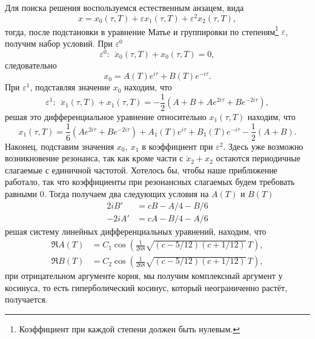 Для поиска решения воспользуемся естественным анзацем, вида
\begin{equation*}
    x = x_0(\tau, T) + \varepsilon x_1 (\tau, T) + \varepsilon^2 x_2 (\tau, T),
\end{equation*}
тогда, после подстановки в уравнение Матье и группировки по степеням\footnote{
    Коэффициент при каждой степени должен быть нулевым.
}  $\varepsilon$, получим набор условий. При $\varepsilon^0$
\begin{equation*}
    \varepsilon^0 \colon \ \ \ddot{x}_0(\tau, T) +  x_0(\tau, T) = 0,
\end{equation*}
следовательно
\begin{equation*}
    x_0 = A(T) e^{i\tau} + B(T) e^{-i\tau}.
\end{equation*}
При $\varepsilon^1$, подставляя значение $x_0$ находим, что
\begin{equation*}
    \varepsilon^1 \colon \ \ \ddot{x}_1(\tau, T) +  x_1(\tau, T) 
    = -\frac{1}{2}\left(
        A+B + A e^{2 i \tau} + B e^{- 2 i \tau}
    \right)
    ,
\end{equation*}
решая это дифференциальное уравнение относительно $x_1(\tau, T)$ находим, что
\begin{equation*}
    x_1(\tau, T) = \frac{1}{6} (Ae^{2 i \tau} + B e^{-2 i \tau}) + 
    A_1(T) e^{i \tau} + B_1(T) e^{-i \tau} - \frac{1}{2}(A+B).
\end{equation*}
Наконец, подставим значения $x_0,\ x_1$ в коэффициент при $\varepsilon^2$. Здесь уже возможно возникновение резонанса, так как кроме части с $\ddot{x}_2 + x_2$ остаются периодичные слагаемые с единичной частотой. Хотелось бы, чтобы наше приближение работало, так что коэффициенты при резонансных слагаемых будем требовать равными 0. Тогда получаем два следующих условия на $A(T)$ и $B(T)$ 
\begin{align*}
    2 i B' &= c B - A/4 - B/6 \\
    -2 i A' &= c A - B/4 - A/6
\end{align*}
решая систему линейных дифференциальных уравнений, находим, что
\begin{align*}
    \Re A(T) &= C_1 \cos\left(
        \frac{1}{268} \sqrt{(c - 5/12)(c+1/12)}\, T
    \right), \\
    \Re B(T) &= C_2 \cos\left(
        \frac{1}{268} \sqrt{(c - 5/12)(c+1/12)}\, T
    \right),
\end{align*}
при отрицательном аргументе корня, мы получим комплексный аргумент у косинуса, то есть гиперболический косинус, который неограниченно растёт, получается. 